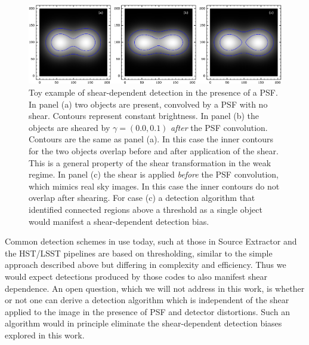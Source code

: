 \documentclass[fleqn,useAMS,usenatbib]{mnras}
\begin{document}
\begin{figure}
  \includegraphics[width=\textwidth]{figures/toy.png}

  \caption{ Toy example of shear-dependent detection in the presence of a
  PSF.  In panel (a) two objects are present, convolved by a PSF with no
  shear.  Contours represent constant brightness.  In panel (b) the objects
  are sheared by $\gamma = (0.0, 0.1)$ {\em after} the PSF convolution.
  Contours are the same as panel (a).  In this case the inner contours for
  the two objects overlap before and after application of the shear.  This is
  a general property of the shear transformation in the weak regime. In panel
  (c) the shear is applied {\em before} the PSF convolution, which mimics real
  sky images. In this case the inner contours do not overlap after shearing.
  For case (c) a detection algorithm that identified connected regions above
  a threshold as a single object would manifest a shear-dependent detection
  bias.  \label{fig:toy} }

\end{figure}

Common detection schemes in use today, such at those in Source Extractor
\citep{Bertin96} and the HST/LSST pipelines \citep{BoschHSC2018,BoschLSST2018}
are based on thresholding, similar to the simple approach described above but
differing in complexity and efficiency. Thus we would expect detections
produced by those codes to also manifest shear dependence. An open question,
which we will not address in this work, is whether or not one can derive a
detection algorithm which is independent of the shear applied to the image
in the presence of PSF and detector distortions. Such an algorithm would
in principle eliminate the shear-dependent detection biases explored in this
work.
\end{document}
